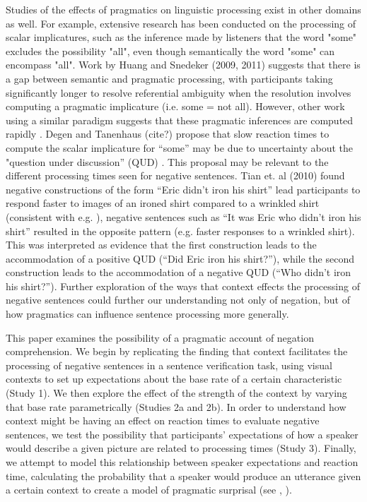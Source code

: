 \documentclass[10pt,letterpaper]{article}
\begin{document}
Studies of the effects of pragmatics on linguistic processing exist in other domains as well.  For example, extensive research has been conducted on the processing of scalar implicatures, such as the inference made by listeners that the word "some" excludes the possibility "all", even though semantically the word "some" can encompass "all".  Work by Huang and Snedeker (2009, 2011) \nocite{huang2009, huang2011} suggests that there is a gap between semantic and pragmatic processing, with participants taking significantly longer to resolve referential ambiguity when the resolution involves computing a pragmatic implicature (i.e. some = not all).  However, other work using a similar paradigm suggests that these pragmatic inferences are computed rapidly \cite{grodner2010}.  Degen and Tanenhaus (cite?) propose that slow reaction times to compute the scalar implicature for ``some'' may be due to uncertainty about the "question under discussion'' (QUD) \cite{roberts1996}.  This proposal may be relevant to the different processing times seen for negative sentences.  Tian et. al (2010) \nocite{tian2010} found negative constructions of the form ``Eric didn't iron his shirt'' lead participants to respond faster to images of an ironed shirt compared to a wrinkled shirt (consistent with e.g. ), negative sentences such as ``It was Eric who didn't iron his shirt'' resulted in the opposite pattern (e.g. faster responses to a wrinkled shirt).  This was interpreted as evidence that the first construction leads to the accommodation of a positive QUD (``Did Eric iron his shirt?''), while the second construction leads to the accommodation of a negative QUD (``Who didn't iron his shirt?'').  Further exploration of the ways that context effects the processing of negative sentences could further our understanding not only of negation, but of how pragmatics can influence sentence processing more generally.  

This paper examines the possibility of a pragmatic account of negation comprehension.  We begin by replicating the finding that context facilitates the processing of negative sentences in a sentence verification task, using visual contexts to set up expectations about the base rate of a certain characteristic (Study 1).  We then explore the effect of the strength of the context by varying that base rate parametrically (Studies 2a and 2b).  In order to understand how context might be having an effect on reaction times to evaluate negative sentences, we test the possibility that participants' expectations of how a speaker would describe a given picture are related to processing times (Study 3).  Finally, we attempt to model this relationship between speaker expectations and reaction time, calculating the probability that a speaker would produce an utterance given a certain context to create a model of pragmatic surprisal (see , ).  
\end{document}
